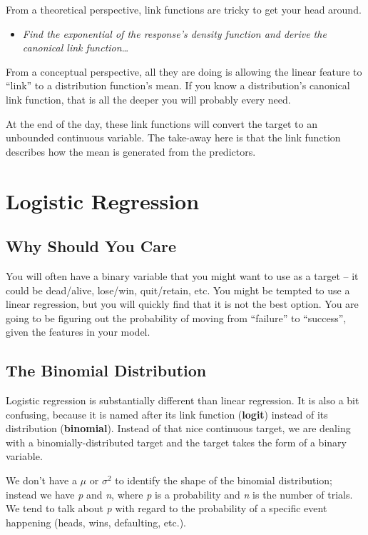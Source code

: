 \documentclass[
  letterpaper,
]{krantz}
\providecommand{\tightlist}{%
  \setlength{\itemsep}{0pt}\setlength{\parskip}{0pt}}\usepackage{longtable,booktabs,array}
\begin{document}
From a theoretical perspective, link functions are tricky to get your
head around.

\begin{itemize}
\tightlist
\item
  \emph{Find the exponential of the response's density function and
  derive the canonical link function}\ldots{}
\end{itemize}

From a conceptual perspective, all they are doing is allowing the linear
feature to ``link'' to a distribution function's mean. If you know a
distribution's canonical link function, that is all the deeper you will
probably every need.

At the end of the day, these link functions will convert the target to
an unbounded continuous variable. The take-away here is that the link
function describes how the mean is generated from the predictors.

\section{Logistic Regression}\label{logistic-regression}

\subsection{Why Should You Care}\label{why-should-you-care}

You will often have a binary variable that you might want to use as a
target -- it could be dead/alive, lose/win, quit/retain, etc. You might
be tempted to use a linear regression, but you will quickly find that it
is not the best option. You are going to be figuring out the probability
of moving from ``failure'' to ``success'', given the features in your
model.

\subsection{The Binomial Distribution}\label{the-binomial-distribution}

Logistic regression is substantially different than linear regression.
It is also a bit confusing, because it is named after its link function
(\textbf{logit}) instead of its distribution (\textbf{binomial}).
Instead of that nice continuous target, we are dealing with a
binomially-distributed target and the target takes the form of a binary
variable.

We don't have a \(\mu\) or \(\sigma^2\) to identify the shape of the
binomial distribution; instead we have \emph{p} and \emph{n}, where
\emph{p} is a probability and \emph{n} is the number of trials. We tend
to talk about \emph{p} with regard to the probability of a specific
event happening (heads, wins, defaulting, etc.).
\end{document}
